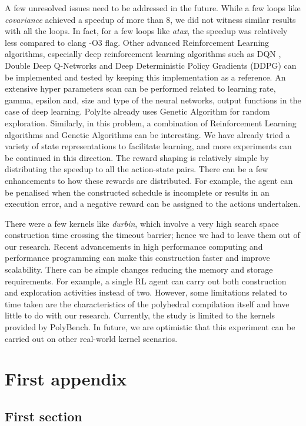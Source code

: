 \documentclass[logo,msc]{infthesis}           %
\begin{document}
A few unresolved issues need to be addressed in the future. While a few loops like \textit{covariance} achieved a speedup of more than 8, we did not witness similar results with all the loops. In fact, for a few loops like \textit{atax}, the speedup was relatively less compared to clang -O3 flag. Other advanced Reinforcement Learning algorithms, especially deep reinforcement learning algorithms such as DQN \cite{DBLP:journals/corr/MnihKSGAWR13}, Double Deep Q-Networks \cite{DDQN} and Deep Deterministic Policy Gradients (DDPG) \cite{BHATNAGAR20092471} can be implemented and tested by keeping this implementation as a reference. An extensive hyper parameters scan can be performed related to learning rate, gamma, epsilon and, size and type of the neural networks, output functions in the case of deep learning. PolyIte already uses Genetic Algorithm for random exploration.
Similarly, in this problem, a combination of Reinforcement Learning algorithms and Genetic Algorithms\cite{GA} can be interesting. We have already tried a variety of state representations to facilitate learning, and more experiments can be continued in this direction. The reward shaping is relatively simple by distributing the speedup to all the action-state pairs. There can be a few enhancements to how these rewards are distributed. For example, the agent can be penalised when the constructed schedule is incomplete or results in an execution error, and a negative reward can be assigned to the actions undertaken.

There were a few kernels like \textit{durbin}, which involve a very high search space construction time crossing the timeout barrier; hence we had to leave them out of our research. Recent advancements in high performance computing and performance programming can make this construction faster and improve scalability. There can be simple changes reducing the memory and storage requirements. For example, a single RL agent can carry out both construction and exploration activities instead of two. However, some limitations related to time taken are the characteristics of the polyhedral compilation itself and have little to do with our research. Currently, the study is limited to the kernels provided by PolyBench. In future, we are optimistic that this experiment can be carried out on other real-world kernel scenarios.







\appendix

\chapter{First appendix}

\section{First section}
\end{document}
